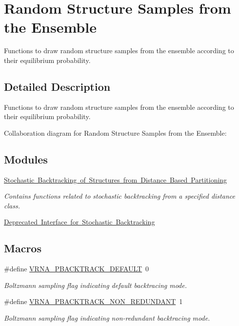 \hypertarget{group__subopt__stochbt}{}\section{Random Structure Samples from the Ensemble}
\label{group__subopt__stochbt}


Functions to draw random structure samples from the ensemble according to their equilibrium probability.  




\subsection{Detailed Description}
Functions to draw random structure samples from the ensemble according to their equilibrium probability. 

Collaboration diagram for Random Structure Samples from the Ensemble\+:
\subsection*{Modules}
\begin{DoxyCompactItemize}
\item 
\mbox{\hyperlink{group__kl__neighborhood__stochbt}{Stochastic Backtracking of Structures from Distance Based Partitioning}}
\begin{DoxyCompactList}\small\item\em Contains functions related to stochastic backtracking from a specified distance class. \end{DoxyCompactList}\item 
\mbox{\hyperlink{group__subopt__stochbt__deprecated}{Deprecated Interface for Stochastic Backtracking}}
\end{DoxyCompactItemize}
\subsection*{Macros}
\begin{DoxyCompactItemize}
\item 
\#define \mbox{\hyperlink{group__subopt__stochbt_ga760aa2fb2d5e3d7521a11454a21e9b9f}{V\+R\+N\+A\+\_\+\+P\+B\+A\+C\+K\+T\+R\+A\+C\+K\+\_\+\+D\+E\+F\+A\+U\+LT}}~0
\begin{DoxyCompactList}\small\item\em Boltzmann sampling flag indicating default backtracing mode. \end{DoxyCompactList}\item 
\#define \mbox{\hyperlink{group__subopt__stochbt_ga9d580ce645aa0c38b69afdf56c332200}{V\+R\+N\+A\+\_\+\+P\+B\+A\+C\+K\+T\+R\+A\+C\+K\+\_\+\+N\+O\+N\+\_\+\+R\+E\+D\+U\+N\+D\+A\+NT}}~1
\begin{DoxyCompactList}\small\item\em Boltzmann sampling flag indicating non-\/redundant backtracing mode. \end{DoxyCompactList}\end{DoxyCompactItemize}
